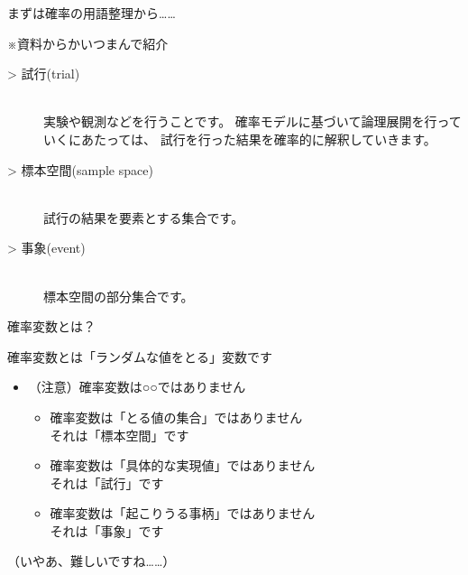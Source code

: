 \documentclass[dvipdfmx,cjk]{beamer}
\begin{document}
\begin{frame}{まずは確率の用語整理から……}

※資料からかいつまんで紹介\pause

\vskip 1cm

\begin{description}

    \item[> 試行(trial)]\mbox{}\\
            実験や観測などを行うことです。
            確率モデルに基づいて論理展開を行っていくにあたっては、
            試行を行った結果を確率的に解釈していきます。\pause

    \item[> 標本空間(sample space)]\mbox{}\\
            試行の結果を要素とする集合です。\pause

    \item[> 事象(event)]\mbox{}\\
            標本空間の部分集合です。

\end{description}

\end{frame}


\begin{frame}{確率変数とは？}\pause

確率変数とは「ランダムな値をとる」変数です\pause

\vskip 1cm

\begin{itemize}

    \item （注意）確率変数は○○ではありません \pause
        \begin{itemize}
        \item 確率変数は「とる値の集合」ではありません\\ \pause
                それは「標本空間」です \pause
        \item 確率変数は「具体的な実現値」ではありません\\ \pause
                それは「試行」です \pause
        \item 確率変数は「起こりうる事柄」ではありません\\ \pause
                それは「事象」です \pause
        \end{itemize}
\end{itemize}

\vskip 1cm

（いやあ、難しいですね……）

\end{frame}
\end{document}
